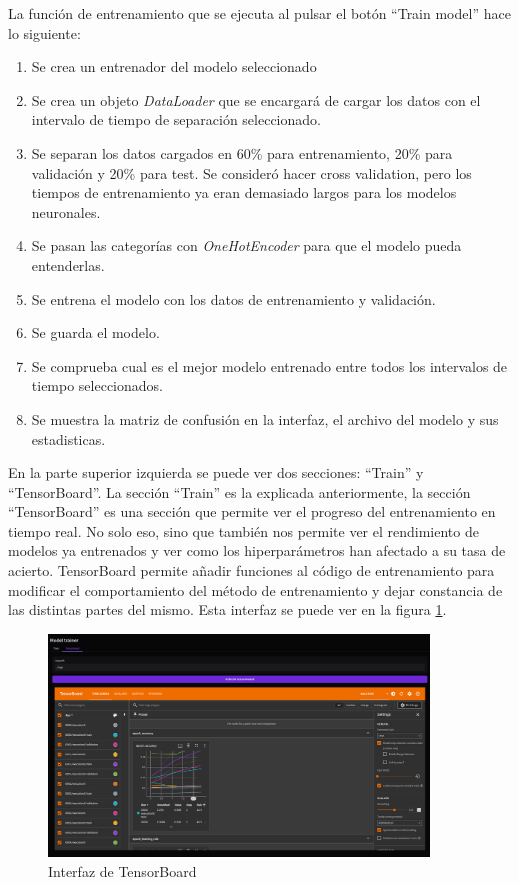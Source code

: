 La función de entrenamiento que se ejecuta al pulsar el botón ``Train model'' hace lo siguiente:
\begin{enumerate}
    \item Se crea un entrenador del modelo seleccionado
    \item Se crea un objeto \textit{DataLoader} que se encargará de cargar los datos con el intervalo de tiempo de separación seleccionado.
    \item Se separan los datos cargados en 60\% para entrenamiento, 20\% para validación y 20\% para test. Se consideró hacer cross validation, pero los tiempos de entrenamiento ya eran demasiado largos para los modelos neuronales.
    \item Se pasan las categorías con \textit{OneHotEncoder} para que el modelo pueda entenderlas.
    \item Se entrena el modelo con los datos de entrenamiento y validación.
    \item Se guarda el modelo.
    \item Se comprueba cual es el mejor modelo entrenado entre todos los intervalos de tiempo seleccionados.
    \item Se muestra la matriz de confusión en la interfaz, el archivo del modelo y sus estadisticas.
\end{enumerate}

En la parte superior izquierda se puede ver dos secciones: ``Train'' y ``TensorBoard''. La sección ``Train'' es la explicada anteriormente, la sección ``TensorBoard'' es una sección que permite ver el progreso del entrenamiento en tiempo real. No solo eso, sino que también nos permite ver el rendimiento de modelos ya entrenados y ver como los hiperparámetros han afectado a su tasa de acierto. TensorBoard permite añadir funciones al código de entrenamiento para modificar el comportamiento del método de entrenamiento y dejar constancia de las distintas partes del mismo. Esta interfaz se puede ver en la figura \ref{fig:interfaz-tensorboard}.

\begin{figure}[h!]
    \centering
    \includegraphics[width=0.9\textwidth]{Imagenes/Bitmap/interfaz-tensorboard.png}
    \caption{Interfaz de TensorBoard}
    \label{fig:interfaz-tensorboard}
\end{figure}

